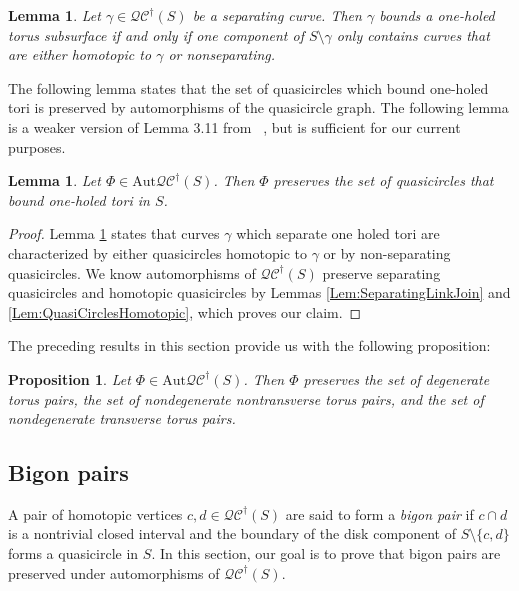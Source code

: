 \documentclass[12pt,a4paper]{amsart}
\theoremstyle{definition}
\theoremstyle{plain}
\newtheorem{proposition}[theorem]{Proposition}
\newtheorem{lemma}[theorem]{Lemma}
\numberwithin{equation}{section}
\newcommand{\qcg}{\mathcal{QC}^{\dagger}}
\newcommand{\Aut}{\mathrm{Aut}}
\begin{document}
\begin{lemma}\label{Lem:CharacterizationSepCurveOneHoledTori}
    Let $\gamma \in \qcg(S)$ be a separating curve. Then $\gamma$ bounds
    a one-holed torus
    subsurface if and only if one component of $S \setminus \gamma$ only contains curves that are either
    homotopic to $\gamma$ or nonseparating.
\end{lemma}

The following lemma states that the set of quasicircles which bound one-holed tori is preserved by automorphisms of the quasicircle graph.
The following lemma is a weaker version of Lemma 3.11 from ~\cite{booth2024automorphisms}, but is sufficient for our current purposes.

\begin{lemma}
    Let $\Phi \in \Aut \qcg(S)$. Then $\Phi$ preserves the set of quasicircles that bound one-holed tori in $S$.
\end{lemma}

\begin{proof}
    Lemma \ref{Lem:CharacterizationSepCurveOneHoledTori} states that curves $\gamma$ which separate one holed tori are characterized by either quasicircles homotopic to $\gamma$ or by non-separating quasicircles.
    We know automorphisms of $\qcg(S)$ preserve separating quasicircles and homotopic quasicircles by Lemmas \ref{Lem:SeparatingLinkJoin} and  \ref{Lem:QuasiCirclesHomotopic}, which proves our claim.
\end{proof}


The preceding results in this section provide us with the following proposition:

\begin{proposition}\label{prop-toruspairs}
    Let $\Phi \in \Aut \qcg(S)$. Then $\Phi$ preserves the set of degenerate torus pairs, the set of nondegenerate nontransverse torus pairs, and the set of nondegenerate transverse torus pairs.
\end{proposition}


\subsection{Bigon pairs}\label{Subsect:bigon}
 A pair of homotopic vertices $c,d \in \qcg(S)$ are said to form a \textit{bigon pair} if $c \cap d$ is a nontrivial closed interval and the boundary of the disk component of $S \setminus \{c,d\}$  forms a quasicircle in $S$.
 In this section, our goal is to prove that bigon pairs are preserved under automorphisms of $\qcg(S)$.
\end{document}
